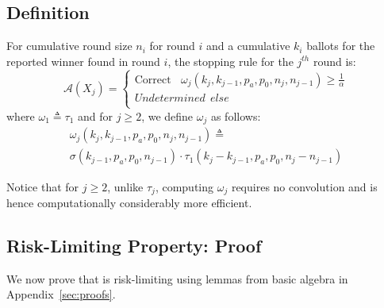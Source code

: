 \subsection{Definition}
\label{sec:prov_def}
\begin{definition}
    \label{def:minervatwo}
    For cumulative round size $n_i$ for round $i$ and a cumulative $k_i$ ballots for the reported winner found in round $i$, the \R \Providence stopping rule for the $j^{th}$ round is:
$$
\mathcal{A}(X_{j})=  \left\{ \begin{array}{ll} \text{Correct} ~~~~ \omega_{j}(k_{j}, k_{j-1}, p_a, p_0, n_j, n_{j-1}) \geq \frac{1}{\alpha}\\
        Undetermined ~~else \\
    \end{array}
    \right .
$$
where $\omega _{1}\triangleq \tau_{1}$ and for $j\ge 2$, we define $\omega _{j}$ as follows:
\begin{equation}
    \begin{aligned}
    \omega_{j}(k_{j}, k_{j-1}, p_a, p_0, n_{j}, n_{j-1})
    \triangleq\\
    \sigma(k_{j-1},p_a,p_0,n_{j-1})\cdot \tau_1(k_{j}-k_{j-1},p_a,p_0,n_j-n_{j-1})
    \end{aligned}
\end{equation}
\end{definition}

Notice that for $j\ge 2$, unlike $\tau_j$, computing $\omega_j$ requires no convolution and is hence computationally considerably more efficient. 

\subsection{Risk-Limiting Property: Proof}
\label{sec:proof}
We now prove that \Providence is risk-limiting using lemmas from basic algebra in Appendix~\ref{sec:proofs}.

